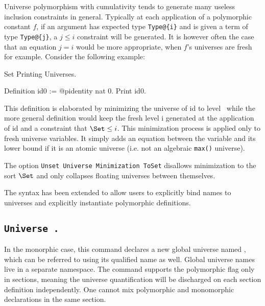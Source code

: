 
Universe polymorphism with cumulativity tends to generate many useless
inclusion constraints in general. Typically at each application of a
polymorphic constant $f$, if an argument has expected type
\verb|Type@{i}| and is given a term of type \verb|Type@{j}|, a $j \le i$
constraint will be generated. It is however often the case that an
equation $j = i$ would be more appropriate, when $f$'s
universes are fresh for example. Consider the following example:

\begin{coq_eval}
Set Printing Universes.
\end{coq_eval}
\begin{coq_example}
Definition id0 := @pidentity nat 0.
Print id0.
\end{coq_example}

This definition is elaborated by minimizing the universe of id to level
\Set~while the more general definition would keep the fresh level i
generated at the application of id and a constraint that $\Set \le i$.
This minimization process is applied only to fresh universe
variables. It simply adds an equation between the variable and its lower
bound if it is an atomic universe (i.e. not an algebraic \texttt{max()}
universe).

The option \texttt{Unset Universe Minimization ToSet} disallows
minimization to the sort $\Set$ and only collapses floating universes
between themselves.


The syntax has been extended to allow users to explicitly bind names to
universes and explicitly instantiate polymorphic definitions.

\subsection{\tt Universe {\ident}.
  \label{UniverseCmd}}

In the monorphic case, this command declares a new global universe named
{\ident}, which can be referred to using its qualified name as
well. Global universe names live in a separate namespace. The command
supports the polymorphic flag only in sections, meaning the universe
quantification will be discharged on each section definition
independently. One cannot mix polymorphic and monomorphic declarations
in the same section.

